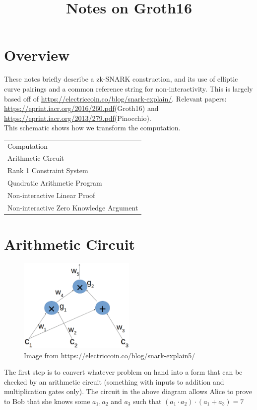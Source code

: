 \documentclass[12pt]{article}
\begin{document}
\title{Notes on Groth16}

\section*{Overview}

These notes briefly describe a zk-SNARK construction, and its
use of elliptic curve pairings and a common reference string for
non-interactivity. This is largely based off of 
\url{https://electriccoin.co/blog/snark-explain/}. Relevant papers:
\url{https://eprint.iacr.org/2016/260.pdf}(Groth16) and
\url{https://eprint.iacr.org/2013/279.pdf}(Pinocchio).\\

This schematic shows how we transform the computation.\\ 


\begin{tabular}{ l }
  Computation \\
  Arithmetic Circuit \\
  Rank 1 Constraint System \\
  Quadratic Arithmetic Program \\
  Non-interactive Linear Proof \\
  Non-interactive Zero Knowledge Argument
\end{tabular}



\section*{Arithmetic Circuit}


\begin{figure}[h]
  \includegraphics[width=0.5\textwidth]{circuit}  
  \caption[Circuit]{Image from https://electriccoin.co/blog/snark-explain5/}
  \label{fig:circuit}
\end{figure}

The first step is to convert whatever problem on hand into 
a form that can be checked by an arithmetic circuit 
(something with inputs to addition and multiplication gates only).
The circuit in the above diagram allows Alice to prove to 
Bob that she knows some $a_1, a_2$ and $a_3$ such that
$(a_1\cdot a_2)\cdot(a_1+a_3) = 7$
\end{document}
